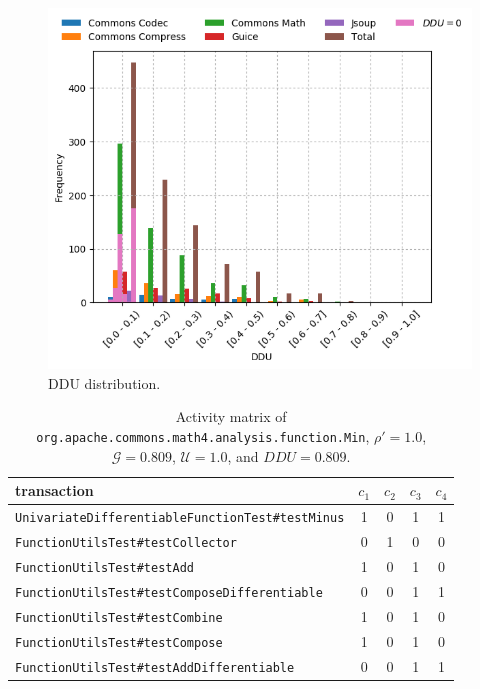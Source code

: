 \documentclass[twoside,a4paper,11pt]{memoir}
\begin{document}
\begin{figure}
    \centering
    \includegraphics[width=\linewidth]{figures/grouped_barchart_ddu}
    \caption{DDU distribution.}%
    \label{fig:ddu}
\end{figure}

\begin{table}[]
\scriptsize
\centering
\caption{Activity matrix of \texttt{org.apache.commons.math4.analysis.function.Min}, \(\rho' = 1.0 \), \(\mathcal{G} = 0.809 \), \(\mathcal{U} = 1.0 \), and \(DDU = 0.809\).}%
\label{tab:min}
\begin{tabular}{l|cccc}
transaction & \(c_1 \) & \(c_2 \) & \(c_3 \) & \(c_4 \) \\ \hline
\texttt{UnivariateDifferentiableFunctionTest\#testMinus} & 1 & 0 & 1 & 1 \\
\texttt{FunctionUtilsTest\#testCollector} & 0 & 1 & 0 & 0 \\
\texttt{FunctionUtilsTest\#testAdd} & 1 & 0 & 1 & 0 \\
\texttt{FunctionUtilsTest\#testComposeDifferentiable} & 0 & 0 & 1 & 1 \\
\texttt{FunctionUtilsTest\#testCombine} & 1 & 0 & 1 & 0 \\
\texttt{FunctionUtilsTest\#testCompose} & 1 & 0 & 1 & 0 \\
\texttt{FunctionUtilsTest\#testAddDifferentiable} & 0 & 0 & 1 & 1
\end{tabular}
\end{table}
\end{document}
